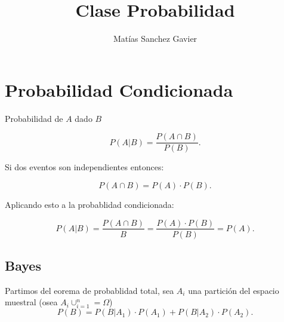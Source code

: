 \documentclass[a4paper]{article}
\title{ Clase Probabilidad}
\author{Matías Sanchez Gavier }
\begin{document}
\maketitle

\section{Probabilidad Condicionada}
	

\begin{tcolorbox}[title=Probabilidad Condicionada]
Probabilidad de $A$ dado $B$ 
\tcblower

\[
	P(A|B) = \frac{P(A \cap B)}{ P(B) }
.\] 
\end{tcolorbox}



Si dos eventos son {\color{blue} independientes}  entonces:
\begin{tcolorbox}[title=Indepencia]
\[
	P(A \cap B ) =  P(A) \cdot P(B)
.\] 
\end{tcolorbox}

Aplicando esto a la probablidad condicionada:

\begin{tcolorbox}[title=Independencia en Condicionada ]
\[
	P(A|B) = \frac{P(A \cap B)}{ B } =  \frac{P(A) \cdot P(B)}{P(B)} = P(A)
.\] 
\end{tcolorbox}



\subsection{ Bayes } 

\begin{tcolorbox}[title=Teorema de Probabilidad Total]
Partimos del  eorema de probablidad total, sea $A_i$ una partición del espacio muestral (osea $A_i \cup_{i=1}^{n} = \Omega$)
\tcblower
\[
	P(B) =  P(B|A_1) \cdot P(A_1) + P(B|A_2) \cdot P(A_2)
.\] 
\end{tcolorbox}
\end{document}
